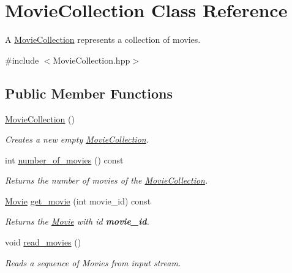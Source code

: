 \hypertarget{class_movie_collection}{\section{Movie\-Collection Class Reference}
\label{d7/d51/class_movie_collection}
}


A \hyperlink{class_movie_collection}{Movie\-Collection} represents a collection of movies.  




{\ttfamily \#include $<$Movie\-Collection.\-hpp$>$}

\subsection*{Public Member Functions}
\begin{DoxyCompactItemize}
\item 
\hyperlink{class_movie_collection_ab17a3e99d78262f0c1d290a1c7385e0f}{Movie\-Collection} ()
\begin{DoxyCompactList}\small\item\em Creates a new empty \hyperlink{class_movie_collection}{Movie\-Collection}. \end{DoxyCompactList}\item 
int \hyperlink{class_movie_collection_adfa021fecab47a7db69fad7ffc7dd1c3}{number\-\_\-of\-\_\-movies} () const 
\begin{DoxyCompactList}\small\item\em Returns the number of movies of the \hyperlink{class_movie_collection}{Movie\-Collection}. \end{DoxyCompactList}\item 
\hyperlink{class_movie}{Movie} \hyperlink{class_movie_collection_af5558ab369dd58dd9294326ea854007c}{get\-\_\-movie} (int movie\-\_\-id) const 
\begin{DoxyCompactList}\small\item\em Returns the \hyperlink{class_movie}{Movie} with id {\bfseries movie\-\_\-id}. \end{DoxyCompactList}\item 
void \hyperlink{class_movie_collection_aefcb7765d0cfd43e4c55feda3abb5e55}{read\-\_\-movies} ()
\begin{DoxyCompactList}\small\item\em Reads a sequence of Movies from input stream. \end{DoxyCompactList}\end{DoxyCompactItemize}



